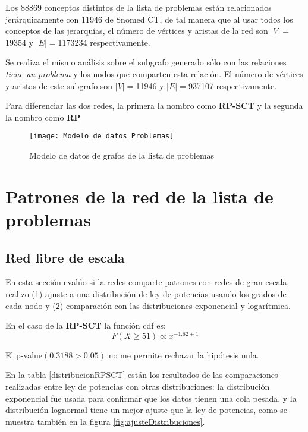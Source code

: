 Los \num{88869} conceptos distintos de la lista de problemas están relacionados jerárquicamente con \num{11946} de Snomed CT, de tal manera que al usar todos los conceptos de las jerarquías, el número de vértices y aristas de la red son $|V|=$\num{19354} y $|E|=$\num{1173234} respectivamente. 

Se realiza el mismo análisis sobre el subgrafo generado sólo con las relaciones \textit{tiene un problema} y los nodos que comparten esta relación. El número de vértices y aristas de este subgrafo son $|V|=$\num{11946} y $|E|=$\num{937107} respectivamente.

Para diferenciar las dos redes, la primera la nombro como \textbf{\acrfull{RP-SCT}} y la segunda la nombro como \textbf{{\acrfull{RP}}}

\begin{figure}[ht]
\caption{Modelo de datos de grafos de la lista de problemas}
\label{fig:ModeloGrafo}
\centering
\texttt{[image: Modelo\_de\_datos\_Problemas]}
\end{figure}

\section{Patrones de la red de la lista de problemas}
\subsection{Red libre de escala}
En esta sección evalúo si la redes comparte patrones con redes de gran escala, realizo (1) ajuste a una distribución de ley de potencias usando los grados de cada nodo y (2) comparación con las distribuciones exponencial y logarítmica.

En el caso de la \textbf{\acrshort{RP-SCT}} la función \acrshort{cdf} es:
\begin{equation}
F(X\geq 51) \propto x^{-1.82 +1}
\end{equation}

El p-value$(0.3188>0.05)$ no me permite rechazar la hipótesis nula.

En la tabla \ref{distribucionRPSCT} están los resultados de las comparaciones realizadas entre ley de potencias con otras distribuciones: la distribución exponencial fue usada para confirmar que los datos tienen una cola pesada, y la distribución lognormal tiene un mejor ajuste que la ley de potencias, como se muestra también en la figura \ref{fig:ajusteDistribuciones}.

